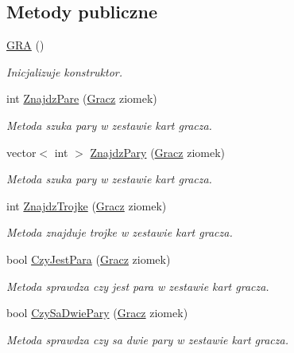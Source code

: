 \subsection*{Metody publiczne}
\begin{DoxyCompactItemize}
\item 
\hyperlink{class_g_r_a_a267a2409e7b7144922b2f058fd6e2724}{G\-R\-A} ()
\begin{DoxyCompactList}\small\item\em Inicjalizuje konstruktor. \end{DoxyCompactList}\item 
int \hyperlink{class_g_r_a_a2f160ac8a217e52308423ddc950488d5}{Znajdz\-Pare} (\hyperlink{class_gracz}{Gracz} ziomek)
\begin{DoxyCompactList}\small\item\em Metoda szuka pary w zestawie kart gracza. \end{DoxyCompactList}\item 
vector$<$ int $>$ \hyperlink{class_g_r_a_a532c7c083060d7c846ac159b1f5c3f81}{Znajdz\-Pary} (\hyperlink{class_gracz}{Gracz} ziomek)
\begin{DoxyCompactList}\small\item\em Metoda szuka pary w zestawie kart gracza. \end{DoxyCompactList}\item 
int \hyperlink{class_g_r_a_a1045d31987634f497e342a4485c7db7b}{Znajdz\-Trojke} (\hyperlink{class_gracz}{Gracz} ziomek)
\begin{DoxyCompactList}\small\item\em Metoda znajduje trojke w zestawie kart gracza. \end{DoxyCompactList}\item 
bool \hyperlink{class_g_r_a_a7c72639bade47c93f59e4d02344b29de}{Czy\-Jest\-Para} (\hyperlink{class_gracz}{Gracz} ziomek)
\begin{DoxyCompactList}\small\item\em Metoda sprawdza czy jest para w zestawie kart gracza. \end{DoxyCompactList}\item 
bool \hyperlink{class_g_r_a_a83ff1a2e629b7368180f5ac0cc06fcfd}{Czy\-Sa\-Dwie\-Pary} (\hyperlink{class_gracz}{Gracz} ziomek)
\begin{DoxyCompactList}\small\item\em Metoda sprawdza czy sa dwie pary w zestawie kart gracza. \end{DoxyCompactList}\item 

\end{DoxyCompactItemize}
